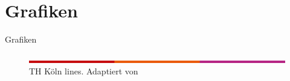 \documentclass{beamer}
\begin{document}
\section{Grafiken}\label{sec:graphics}
\begin{frame}{Grafiken}
    \begin{figure}\label{thk-linien}
        \includegraphics[width=\textwidth]{figures/thk-lines.png}
        \caption[TH Köln lines]{TH Köln lines. Adaptiert von \cite{source}}
    \end{figure}
\end{frame}
\end{document}
